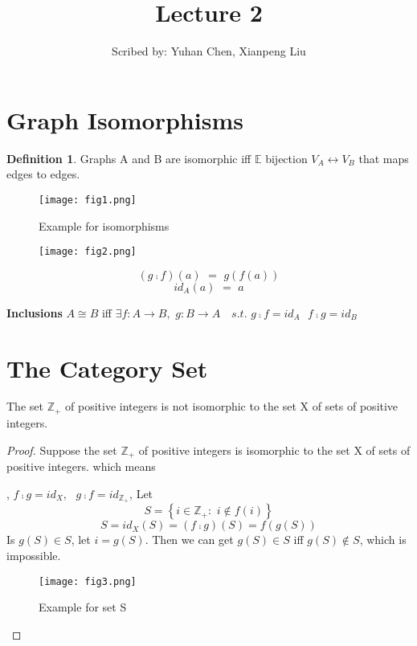 \documentclass{article}
\theoremstyle{definition}
\newtheorem{definition}{Definition}
\begin{document}
  \title{Lecture 2}
  \author{Scribed by: Yuhan Chen, Xianpeng Liu }
  \maketitle
  
 \section{Graph Isomorphisms} 
  \begin{definition}
  Graphs A and B are isomorphic iff $\mathbb{E}$ bijection $V_A\leftrightarrow V_B$ that maps edges to edges.
  \end{definition}
  
   \begin{figure}[h]
    \centering
      \texttt{[image: fig1.png]}
      \caption{Example for isomorphisms}
    \end{figure}
    
       \begin{figure}[h]
    \centering
      \texttt{[image: fig2.png]}
    \end{figure}
$$
\left( g\comp f \right) \left( a \right) \,\,=\,\,g\left( f\left( a \right) \right) 
$$
$$
id_A\left( a \right) \,\,=\,\,a
$$

\textbf{Inclusions} $A\cong B$ iff $
\exists f:A\rightarrow B,\,\,g:B\rightarrow A\,\,\,\,\,\,s.t.\,\,g\comp f=id_A\,\,\,\,f\comp g=id_B
$

\section{The Category Set}

  \begin{theorem}
    The set $\mathbb{Z}_+$ of positive integers is not isomorphic to the set X of sets of positive integers.
  \end{theorem}
  \begin{proof}
    Suppose the set $\mathbb{Z}_+$ of positive integers is isomorphic to the set X of sets of positive integers. which means 
  , $f\comp g=id_X,\,\,\,\,g\comp f=id_{\mathbb{Z}_+}$,
Let 
$$S=\left\{ i\in \mathbb{Z}_+:\,\,i\notin f\left( i \right) \right\} $$
$$S=id_X\left( S \right) =\left( f\comp g \right) \left( S \right) =f\left( g\left( S \right) \right) $$
Is $g(S)\in S$, let $i=g(S)$. Then we can get $g(S)\in S$ iff $g(S)\notin S$, which is impossible.
   \begin{figure}[h]
    \centering
      \texttt{[image: fig3.png]}
      \caption{Example for set S}
    \end{figure}
  \end{proof}
\end{document}
